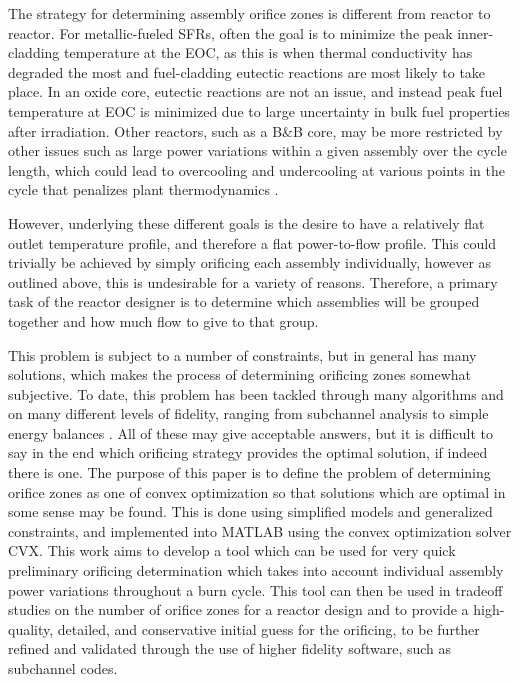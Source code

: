 \documentclass[11pt, oneside]{article}   	%
\begin{document}
The strategy for determining assembly orifice zones is different from reactor to reactor.
For metallic-fueled SFRs, often the goal is to minimize the peak inner-cladding temperature at the EOC, as this is when thermal conductivity has degraded the most and fuel-cladding eutectic reactions are most likely to take place.
In an oxide core, eutectic reactions are not an issue, and instead peak fuel temperature at EOC is minimized due to large uncertainty in bulk fuel properties after irradiation.
Other reactors, such as a B\&B core, may be more restricted by other issues such as large power variations within a given assembly over the cycle length, which could lead to overcooling and undercooling at various points in the cycle that penalizes plant thermodynamics \cite{terrapower}.

However, underlying these different goals is the desire to have a relatively flat outlet temperature profile, and therefore a flat power-to-flow profile.
This could trivially be achieved by simply orificing each assembly individually, however as outlined above, this is undesirable for a variety of reasons.
Therefore, a primary task of the reactor designer is to determine which assemblies will be grouped together and how much flow to give to that group.

This problem is subject to a number of constraints, but in general has many solutions, which makes the process of determining orificing zones somewhat subjective.
To date, this problem has been tackled through many algorithms and on many different levels of fidelity, ranging from subchannel analysis to simple energy balances \cite{}.
All of these may give acceptable answers, but it is difficult to say in the end which orificing strategy provides the optimal solution, if indeed there is one.
The purpose of this paper is to define the problem of determining orifice zones as one of convex optimization so that solutions which are optimal in some sense may be found.
This is done using simplified models and generalized constraints, and implemented into MATLAB using the convex optimization solver CVX.
This work aims to develop a tool which can be used for very quick preliminary orificing determination which takes into account individual assembly power variations throughout a burn cycle.
This tool can then be used in tradeoff studies on the number of orifice zones for a reactor design and to provide a high-quality, detailed, and conservative initial guess for the orificing, to be further refined and validated through the use of higher fidelity software, such as subchannel codes.
\end{document}

